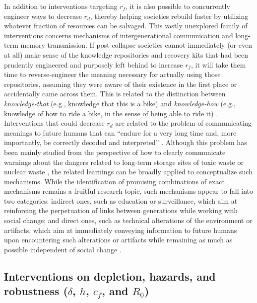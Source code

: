 In addition to interventions targeting $r_f$, it is also possible to concurrently engineer ways to decrease $r_d$, thereby helping societies rebuild faster by utilizing whatever fraction of resources can be salvaged. This vastly unexplored family of interventions concerns mechanisms of intergenerational communication and long-term memory transmission. If post-collapse societies cannot immediately (or even at all) make sense of the knowledge repositories and recovery kits that had been prudently engineered and purposely left behind to increase $r_f$, it will take them time to reverse-engineer the meaning necessary for actually using those repositories, assuming they were aware of their existence in the first place or accidentally came across them. This is related to the distinction between \emph{knowledge-that} (e.g., knowledge that this is a bike) and \emph{knowledge-how} (e.g., knowledge of how to ride a bike, in the sense of being able to ride it) \citep{Ren2012-kh}. Interventions that could decrease $r_d$ are related to the problem of communicating meanings to future humans that can ``endure for a very long time and, more importantly, be correctly decoded and interpreted'' \citep{Mazzucchelli2022-lf}. Although this problem has been mainly studied from the perspective of how to clearly communicate warnings about the dangers related to long-term storage sites of toxic waste \citep{Sandlos2019-gm} or nuclear waste \citep{Keating2023-ns}, the related learnings can be broadly applied to conceptualize such mechanisms. While the identification of promising combinations of exact mechanisms remains a fruitful research topic, such mechanisms appear to fall into two categories: indirect ones, such as education or surveillance, which aim at reinforcing the perpetuation of links between generations while working with social change; and direct ones, such as technical alterations of the environment or artifacts, which aim at immediately conveying information to future humans upon encountering such alterations or artifacts while remaining as much as possible independent of social change \citep{Calla2023-ww}.

\subsection{\texorpdfstring{Interventions on depletion, hazards, and robustness ($\delta$, $h$, $c_f$, and $R_0$)}{Interventions on depletion, hazards, and robustness (delta, h, cf, and R0)}}

